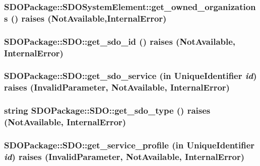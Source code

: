 \subsubsection[{get\_\-owned\_\-organizations}]{ SDOPackage::SDOSystemElement::get\_\-owned\_\-organizations ()  raises (NotAvailable,InternalError)\hspace{0.3cm}{\ttfamily  [inherited]}}\label{interfaceSDOPackage_1_1SDOSystemElement_a81238047c5dfa47d2cf3ebce1b78b240}
\subsubsection[{get\_\-sdo\_\-id}]{ SDOPackage::SDO::get\_\-sdo\_\-id ()  raises (NotAvailable, InternalError)}\label{interfaceSDOPackage_1_1SDO_a08ccbbb1855dff27c598c38ce0c5aab1}
\subsubsection[{get\_\-sdo\_\-service}]{ SDOPackage::SDO::get\_\-sdo\_\-service (in {\bf UniqueIdentifier} {\em id})  raises (InvalidParameter, NotAvailable, InternalError)}\label{interfaceSDOPackage_1_1SDO_a7d612d97207fecaf134959b93c6b3e60}
\subsubsection[{get\_\-sdo\_\-type}]{\setlength{\rightskip}{0pt plus 5cm}string SDOPackage::SDO::get\_\-sdo\_\-type ()  raises (NotAvailable, InternalError)}\label{interfaceSDOPackage_1_1SDO_a2b4141376be89eb90fd4904643476320}
\subsubsection[{get\_\-service\_\-profile}]{ SDOPackage::SDO::get\_\-service\_\-profile (in {\bf UniqueIdentifier} {\em id})  raises (InvalidParameter, NotAvailable, InternalError)}\label{interfaceSDOPackage_1_1SDO_a5ea1929e10ccc5e8b5896c4b0fbee635}
